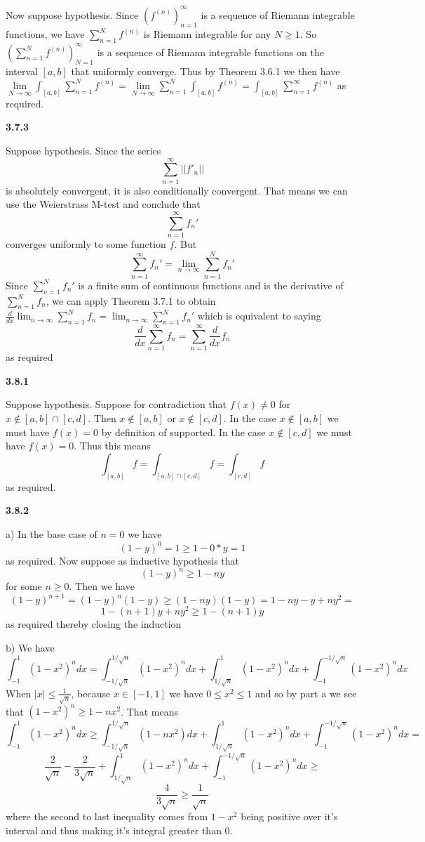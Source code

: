 \documentclass[12pt]{article}
\begin{document}
Now suppose hypothesis. Since $(f^{(n)})^\infty_{n=1}$ is a sequence of Riemann integrable functions, we have $\sum_{n=1}^{N}f^{(n)}$ is Riemann integrable for any $N\geq 1$.
So $ 
(\sum_{n=1}^{N}f^{(n)})^\infty_{N=1}$ is a sequence of Riemann integrable functions on the interval $[a,b]$ that uniformly converge. Thus by Theorem 3.6.1 we then have $ \lim\limits_{N\to \infty}\int_{[a,b]}\sum_{n=1}^{N}f^{(n)} =\lim\limits_{N\to \infty}\sum_{n=1}^{N}\int_{[a,b]}f^{(n)} =\int_{[a,b]}\sum_{n=1}^\infty  f^{(n)}$ as required.

\textbf{3.7.3}

Suppose hypothesis. Since the series 
\[\sum_{n=1}^\infty ||f'_n||\] is absolutely convergent, it is also conditionally convergent. That means we can use the Weierstrass M-test and conclude that \[\sum_{n=1}^\infty f_n'\] converges uniformly to some function $f$. But 
\[\sum_{n=1}^\infty f_n' = \lim_{n\to\infty}\sum_{n=1}^N f_n'\] Since $\sum_{n=1}^N f_n' $ is a finite sum of continuous functions and is the derivative of $ \sum_{n=1}^N f_n$, we can apply Theorem 3.7.1 to obtain $ \frac{d}{dx}\lim_{n\to\infty}\sum_{n=1}^N f_n=\lim_{n\to\infty}\sum_{n=1}^N f_n'$ which is equivalent to saying
\[\frac{d}{dx}\sum_{n=1}^\infty f_n = \sum_{n=1}^\infty \frac{d}{dx}f_n\] as required

\textbf{3.8.1}

Suppose hypothesis. Suppose for contradiction that $f(x) \neq0$ for $x\notin [a,b]\cap [c,d]$. Then $x\notin[a,b]$ or $x\notin[c,d]$. In the case $x\notin[a,b]$ we must have $f(x) = 0$ by definition of supported. In the case $ x\notin[c,d]$ we must have $f(x) = 0$. Thus this means 
\[\int_{[a,b]}f = \int_{[a,b]\cap [c,d]}f =\int_{[c,d]}f \] as required.

\textbf{3.8.2}

a) In the base case of $n=0$ we have 
\[(1-y)^0 = 1 \geq 1- 0*y = 1\] as required.
Now suppose as inductive hypothesis that 
\[(1-y)^n \geq 1-ny\] for some $n\geq 0$. Then we have
\[(1-y)^{n+1} = (1-y)^{n}(1-y)\geq (1-ny)(1-y) = 1 - ny -y +ny^2 =\] \[1-(n+1)y +ny^2\geq 1-(n+1)y\] as required thereby closing the induction

b) We have
\[\int_{-1}^1(1-x^2)^ndx = \int_{-1/\sqrt{n}}^{1/\sqrt{n}}(1-x^2)^ndx +\int_{1/\sqrt{n}}^{1}(1-x^2)^ndx+\int_{-1}^{-1/\sqrt{n}}(1-x^2)^ndx\]When $|x| \leq \frac{1}{\sqrt{n}}$, because $x\in[-1,1]$ we have $0\leq x^2\leq 1$ and so by part a we see that $(1-x^2)^n \geq 1-nx^2$. That means 
\[\int_{-1}^1(1-x^2)^ndx \geq \int_{-1/\sqrt{n}}^{1/\sqrt{n}}(1-nx^2)dx+ \int_{1/\sqrt{n}}^{1}(1-x^2)^ndx+\int_{-1}^{-1/\sqrt{n}}(1-x^2)^ndx=\]
\[\frac{2}{\sqrt{n}} - \frac{2}{3\sqrt{n}} +\int_{1/\sqrt{n}}^{1}(1-x^2)^ndx+\int_{-1}^{-1/\sqrt{n}}(1-x^2)^ndx\geq\]
\[\frac{4}{3\sqrt{n}}\geq \frac{1}{\sqrt{n}}\] where the second to last inequality comes from $1-x^2$ being positive over it's interval and thus making it's integral greater than 0.
\end{document}
